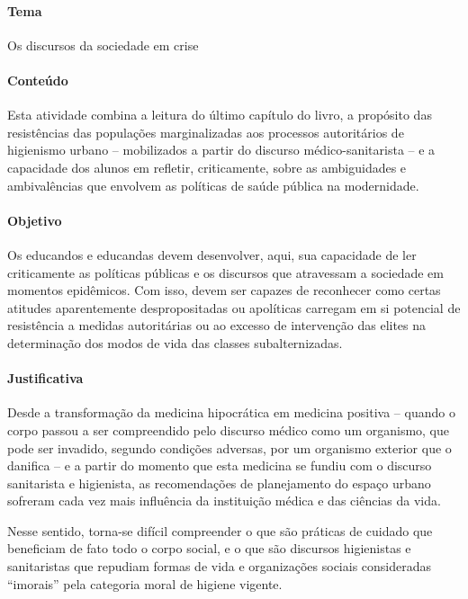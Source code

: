 \documentclass[12pt]{extarticle}
\begin{document}
\paragraph{Tema} Os discursos da sociedade em crise

\paragraph{Conteúdo}

Esta atividade combina a leitura do último capítulo do livro, a
propósito das resistências das populações marginalizadas aos processos
autoritários de higienismo urbano -- mobilizados a partir do discurso
médico-sanitarista -- e a capacidade dos alunos em refletir,
criticamente, sobre as ambiguidades e ambivalências que envolvem as
políticas de saúde pública na modernidade.

\paragraph{Objetivo}

Os educandos e educandas devem desenvolver, aqui, sua capacidade de ler
criticamente as políticas públicas e os discursos que atravessam a
sociedade em momentos epidêmicos. Com isso, devem ser capazes de
reconhecer como certas atitudes aparentemente despropositadas ou
apolíticas carregam em si potencial de resistência a medidas
autoritárias ou ao excesso de intervenção das elites na determinação dos
modos de vida das classes subalternizadas.

\paragraph{Justificativa}

Desde a transformação da medicina hipocrática em medicina positiva --
quando o corpo passou a ser compreendido pelo discurso médico como um
organismo, que pode ser invadido, segundo condições adversas, por um
organismo exterior que o danifica -- e a partir do momento que esta
medicina se fundiu com o discurso sanitarista e higienista, as
recomendações de planejamento do espaço urbano sofreram cada vez mais
influência da instituição médica e das ciências da vida.

Nesse sentido, torna-se difícil compreender o que são práticas de
cuidado que beneficiam de fato todo o corpo social, e o que são
discursos higienistas e sanitaristas que repudiam formas de vida e
organizações sociais consideradas ``imorais'' pela categoria moral de
higiene vigente.
\end{document}
